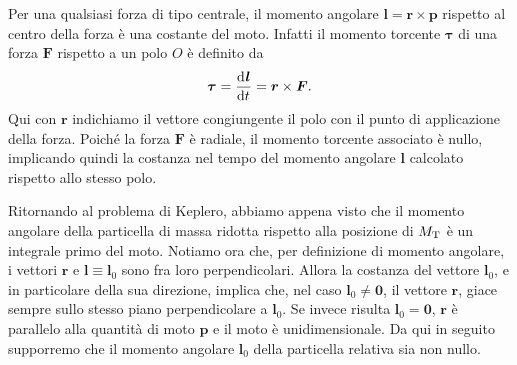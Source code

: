 Per una qualsiasi forza di tipo centrale, il momento angolare $\bm{l} = \bm{r}
\times \bm{p}$ rispetto al centro della forza è una costante del moto. Infatti
il momento torcente $\bm{\tau}$ di una forza $\bm{F}$ rispetto a un polo $O$ è
definito da
\begin{equation}
  \bm{\tau}= \frac{{\mathop{}\!\mathrm{d}^{}}\bm{l}}{\mathop{}\!\mathrm{d} {t}^{}} = \bm{r}\times\bm{F}.
\end{equation}
Qui con $\bm{r}$ indichiamo il vettore congiungente il polo con il punto di
applicazione della forza. Poiché la forza $\bm{F}$ è radiale, il momento
torcente associato è nullo, implicando quindi la costanza nel tempo del momento
angolare $\bm{l}$ calcolato rispetto allo stesso polo.

Ritornando al problema di Keplero, abbiamo appena visto che il momento angolare
della particella di massa ridotta rispetto alla posizione di $M_\textup{T}$ è un
integrale primo del moto. Notiamo ora che, per definizione di momento angolare,
i vettori $\bm{r}$ e $\bm{l}\equiv\bm{l}_0$ sono fra loro perpendicolari. Allora
la costanza del vettore $\bm{l}_0$, e in particolare della sua direzione,
implica che, nel caso $\bm{l}_0\neq\bm{0}$, il vettore $\bm{r}$, giace sempre
sullo stesso piano perpendicolare a $\bm{l}_0$. Se invece risulta
$\bm{l}_0=\bm{0}$, $\bm{r}$ è parallelo alla quantità di moto $\bm{p}$ e il moto
è unidimensionale. Da qui in seguito supporremo che il momento angolare
$\bm{l}_0$ della particella relativa sia non nullo.

